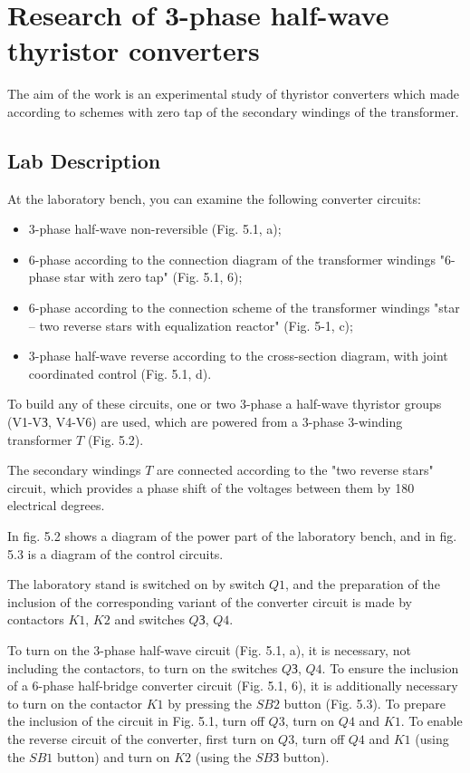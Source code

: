 \documentclass[a4paper,14pt]{article}
\begin{document}
 

\section{Research of 3-phase half-wave thyristor converters}

The aim of the work is an experimental study of thyristor converters which made according to schemes with zero tap of the secondary windings of the transformer.

\subsection{Lab Description}

At the laboratory bench, you can examine the following converter circuits:

\begin{itemize}
\item 3-phase half-wave non-reversible (Fig. 5.1, a);

\item 6-phase according to the connection diagram of the transformer windings "6-phase star with zero tap" (Fig. 5.1, 6);

\item 6-phase according to the connection scheme of the transformer windings 
"star -- two reverse stars with equalization reactor" (Fig. 5-1, c);

\item 3-phase half-wave reverse according to the cross-section diagram, with joint coordinated control (Fig. 5.1, d).
\end{itemize}

To build any of these circuits, one or two 3-phase a half-wave thyristor groups (V1-VЗ, V4-V6) are used, which are powered from a 3-phase 3-winding transformer $T$ (Fig. 5.2).

The secondary windings $T$ are connected according to the "two reverse stars" circuit, which provides a phase shift of the voltages between them by 180 electrical degrees.

In fig. 5.2 shows a diagram of the power part of the laboratory bench, and in fig. 5.3 is a diagram of the control circuits.

The laboratory stand is switched on by switch $Q1$, and the preparation of the inclusion of the corresponding variant of the converter circuit is made by contactors $K1$, $K2$ and switches $QЗ$, $Q4$.

To turn on the 3-phase half-wave circuit (Fig. 5.1, a), it is necessary, not including the contactors, to turn on the switches $QЗ$, $Q4$.
To ensure the inclusion of a 6-phase half-bridge converter circuit (Fig. 5.1, 6), it is additionally necessary to turn on the contactor $K1$ by pressing the $SB2$ button (Fig. 5.3).
To prepare the inclusion of the circuit in Fig. 5.1, turn off $Q3$, turn on $Q4$ and $K1$.
To enable the reverse circuit of the converter, first turn on $Q3$, turn off $Q4$ and $K1$ (using the $SB1$ button) and turn on $K2$ (using the $SBЗ$ button).
\end{document}
